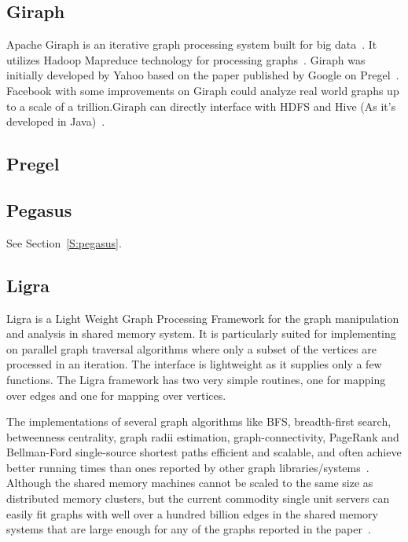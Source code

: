 \subsection{Giraph}

Apache Giraph is an iterative graph processing system built for big
data~\cite{www-giraph-apache}. It utilizes Hadoop Mapreduce technology
for processing graphs~\cite{www-apache-giraph-wiki}.  Giraph was
initially developed by Yahoo based on the paper published by Google on
Pregel~\cite{www-apache-giraph-pcworld}.  Facebook with some
improvements on Giraph could analyze real world graphs up to a scale
of a trillion.Giraph can directly interface with HDFS and Hive (As
it's developed in Java)~\cite{www-apache-giraph-fb}.

     \pv
   
\subsection{Pregel}

\pv 

\subsection{Pegasus}

See Section~\ref{S:pegasus}.

\subsection{Ligra}

     Ligra is a Light Weight Graph Processing Framework for the graph
     manipulation and analysis in shared memory system. It is
     particularly suited for implementing on parallel graph traversal
     algorithms where only a subset of the vertices are processed in an
     iteration. The interface is lightweight as it supplies only a
     few functions. The Ligra framework has two very simple routines,
     one for mapping over edges and one for mapping over vertices.

     The implementations of several graph algorithms like BFS,
     breadth-first search, betweenness centrality, graph radii
     estimation, graph-connectivity, PageRank and Bellman-Ford
     single-source shortest paths efficient and scalable, and often
     achieve better running times than ones reported by other graph
     libraries/systems~\cite{ligra-paper-2013}.  Although the shared
     memory machines cannot be scaled to the same size as distributed
     memory clusters, but the current commodity single unit servers
     can easily fit graphs with well over a hundred billion edges in
     the shared memory systems that are large enough for any of the
     graphs reported in the paper~\cite{ligra-paper-2}.

